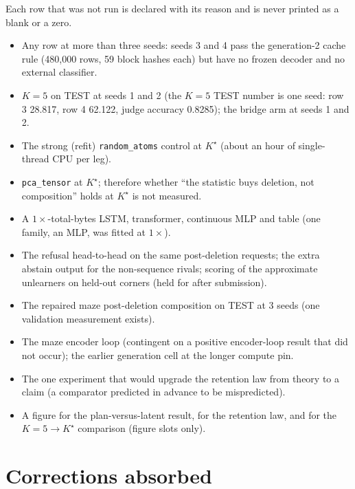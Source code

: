 \documentclass{article} %
\newcommand{\Kstar}{\ensuremath{K^{\star}}}
\begin{document}
Each row that was not run is declared with its reason and is never printed as a blank or a zero.
\begin{itemize}[leftmargin=*,itemsep=1pt]
\item Any row at more than three seeds: seeds 3 and 4 pass the generation-2 cache rule
  (480,000 rows, 59 block hashes each) but have no frozen decoder and no external classifier.
\item $K=5$ on TEST at seeds 1 and 2 (the $K=5$ TEST number is one seed: row 3 28.817, row 4
  62.122, judge accuracy 0.8285); the bridge arm at seeds 1 and 2. %
\item The strong (refit) \texttt{random\_atoms} control at $\Kstar$ (about an hour of
  single-thread CPU per leg). %
\item \texttt{pca\_tensor} at $\Kstar$; therefore whether ``the statistic buys deletion, not
  composition'' holds at $\Kstar$ is not measured.
\item A $1\times$-total-bytes LSTM, transformer, continuous MLP and table (one family, an MLP, was
  fitted at $1\times$).
\item The refusal head-to-head on the same post-deletion requests; the extra abstain output for the
  non-sequence rivals; scoring of the approximate unlearners on held-out corners (held for after
  submission).
\item The repaired maze post-deletion composition on TEST at 3 seeds (one validation measurement
  exists).
\item The maze encoder loop (contingent on a positive encoder-loop result that did not occur); the
  earlier generation cell at the longer compute pin.
\item The one experiment that would upgrade the retention law from theory to a claim (a comparator
  predicted in advance to be mispredicted).
\item A figure for the plan-versus-latent result, for the retention law, and for the $K=5\to\Kstar$
  comparison (figure slots only).
\end{itemize}

\section{Corrections absorbed}
\label{app:corrections}
\end{document}
